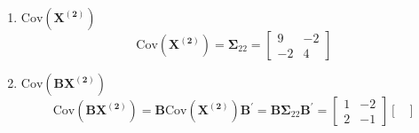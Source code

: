 \begin{enumerate}[font=\bfseries]
\begin{enumerate}
\[\begin{bmatrix}
                        X_4
                    \end{bmatrix}
                \right]
                =
                \begin{bmatrix}
                    1 & -2 \\
                    2 & -1
                \end{bmatrix}
                E\left[
                    \begin{bmatrix}
                        X_3 \\
                        X_4
                    \end{bmatrix}
                \right]
                =
                \begin{bmatrix}
                    1 & -2 \\
                    2 & -1
                \end{bmatrix}
                \begin{bmatrix}
                    2 \\
                    1
                \end{bmatrix}
                =
                \begin{bmatrix}
                    0 \\
                    3
                \end{bmatrix}
            \]
            \item $\text{Cov}\left(\mathbf{X^{(2)}}\right)$
            \[
                \text{Cov}\left(\mathbf{X^{(2)}}\right)
                =
                \mathbf{\Sigma}_{22}
                =
                \begin{bmatrix}
                    9 & -2 \\
                    -2 & 4
                \end{bmatrix}
            \]
            \item $\text{Cov}\left(\mathbf{B}\mathbf{X^{(2)}}\right)$
            \[
                \text{Cov}\left(\mathbf{B}\mathbf{X^{(2)}}\right)
                =
                \mathbf{B}\text{Cov}\left(\mathbf{X^{(2)}}\right)\mathbf{B}^\prime
                =
                \mathbf{B}\mathbf{\Sigma}_{22}\mathbf{B}^\prime
                =
                \begin{bmatrix}
                    1 & -2 \\
                    2 & -1
                \end{bmatrix}
                \begin{bmatrix}

\end{bmatrix}\]
\end{enumerate}
\end{enumerate}
